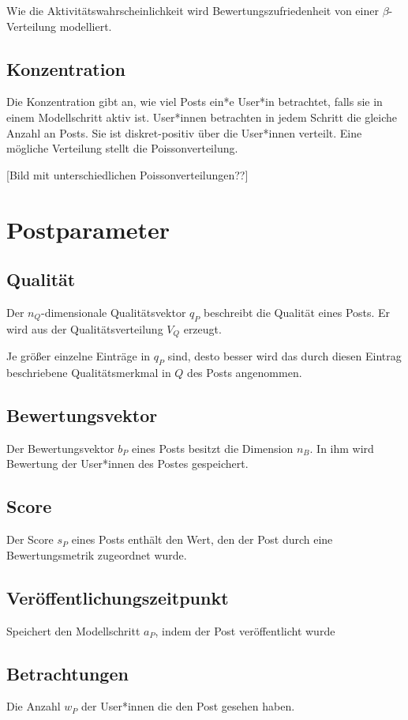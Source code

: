Wie die Aktivitätswahrscheinlichkeit wird Bewertungszufriedenheit von einer $\beta$-Verteilung modelliert.

\subsection{Konzentration}

Die Konzentration gibt an, wie viel Posts ein*e User*in betrachtet, falls sie in einem Modellschritt aktiv ist. User*innen betrachten in jedem Schritt die gleiche Anzahl an Posts.
Sie ist diskret-positiv über die User*innen verteilt. Eine mögliche Verteilung stellt die Poissonverteilung.

[Bild mit unterschiedlichen Poissonverteilungen??]


\section{Postparameter}

\subsection{Qualität}
\label{pqualitaet}

Der $n_Q$-dimensionale Qualitätsvektor $q_P$ beschreibt die Qualität eines Posts. Er wird aus der Qualitätsverteilung $V_Q$ erzeugt. 

Je größer einzelne Einträge in $q_P$ sind, desto besser wird das durch diesen Eintrag beschriebene Qualitätsmerkmal in $Q$ des Posts angenommen.

\subsection{Bewertungsvektor}

Der Bewertungsvektor $b_P$ eines Posts besitzt die Dimension $n_B$. In ihm wird Bewertung der User*innen des Postes gespeichert.

\subsection{Score}

Der Score $s_P$ eines Posts enthält den Wert, den der Post durch eine Bewertungsmetrik zugeordnet wurde.

\subsection{Veröffentlichungszeitpunkt}

Speichert den Modellschritt $a_P$, indem der Post veröffentlicht wurde

\subsection{Betrachtungen}

Die Anzahl $w_P$ der User*innen  die den Post gesehen haben.

